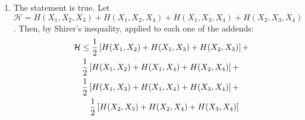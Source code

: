 \documentclass[11pt]{article} \usepackage{amssymb}
\newtheorem{theorem}{Theorem}[section]
\newtheorem{lemma}[theorem]{Lemma}
\newenvironment{proof}{\noindent \textbf{Proof:}}{$\Box$}
\begin{document}
\begin{enumerate}
Let $X=(X_1,\ldots,X_n)\in S$ be picked from the uniform distribution over
$S$.
\begin{lemma}
  $H(X_i|X_1,\ldots,X_{i-1},X_{i+1},\ldots,X_n)\geq {\log 3|E_i|\over|S|}$
\end{lemma}
\begin{proof}
Assume w.l.o.g that $i=1$. Then let $K_1$ be the number of values 
of $X_2,\ldots,X_n$ for which there is only one possible value of $X_1$,
and likewise define $K_2$ and $K_3$. Then $|S|=K_1+2K_2+3K_3$ and
 $|E_1|=K_2+3K_3$. The entropy of
$X_1$ is:
\begin{eqnarray*}
  H(X_1)&=&{K_1\over |S|}\cdot 0 +{2K_2\over|S|}\log 2 + {3K_3\over |S|}\log 3\\
&=& {\log 3\over|S|}\left({2\over \log 3}K_2+3K_3\right)\\ 
&\geq& {\log 3|E_1|\over|S|}
\end{eqnarray*}
\end{proof}
\begin{theorem}
  $|E|\leq |S|\log|S|$
\end{theorem}
\begin{proof}
  \begin{eqnarray*}
    \log|S|&=&H(X_1,\ldots,X_n)\\
    &\geq& H(X_1)+H(X_2|X_1)+H(X_3|X_1,X_2)+\cdots+H(X_n|X_1,\ldots,X_{n-1})\\
    &\geq& H(X_1|X_2,\ldots,X_n)+H(X_2|X_1,X_3,\ldots,X_n)+\cdots+H(X_n|X_1,\ldots,X_{n-1})\\
    &\geq& {\log3|E_1|\over|S|}+\cdots+{\log3|E_n|\over|S|}\\
    &=&{\log3|E|\over|S|}
  \end{eqnarray*}
and hence
\begin{equation*}
  |E|\leq{1\over \log 3}|S|\log|S|
\end{equation*}
\end{proof}
\item
The statement is true.
Let $\mathcal{H}= H(X_1,X_2,X_3)+H(X_1,X_2,X_4)+H(X_1,X_3,X_4)+H(X_2,X_3,X_4)$.
Then, by Shirer's inequality, applied to each one of the addends:
  \begin{eqnarray*}
\lefteqn{\mathcal{H}\leq
  {1\over 2}\left[H(X_1,X_2)+H(X_1,X_3)+H(X_2,X_3)\right]+}\\
&&{1\over 2}\left[H(X_1,X_2)+H(X_1,X_4)+H(X_2,X_4)\right]+\\
&&{1\over 2}\left[H(X_1,X_3)+H(X_1,X_4)+H(X_3,X_4)\right]+\\
&&{1\over 2}\left[H(X_2,X_3)+H(X_2,X_4)+H(X_3,X_4)\right]\\

\end{eqnarray*}
\end{enumerate}
\end{document}

